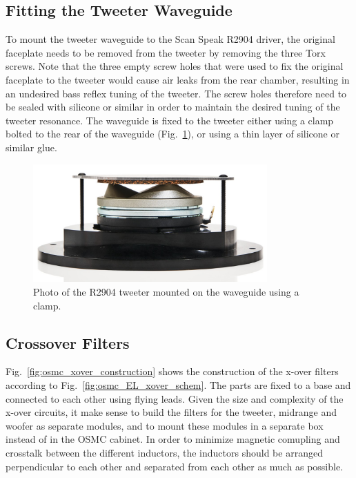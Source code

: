 \documentclass[12pt,a4paper]{article}
\providecommand{\figr}[1]{Fig.~\ref{fig:#1}}
\providecommand{\figlabel}[1]{\label{fig:#1}}
\begin{document}
\subsection{Fitting the Tweeter Waveguide}
To mount the tweeter waveguide to the Scan Speak R2904 driver, the original faceplate needs to be removed from the tweeter by removing the three Torx screws. Note that the three empty screw holes that were used to fix the original faceplate to the tweeter would cause air leaks from the rear chamber, resulting in an undesired bass reflex tuning of the tweeter.\cite{scan_waveguide_bassreflex} The screw holes therefore need to be sealed with silicone or similar in order to maintain the desired tuning of the tweeter resonance.\cite{scan_waveguide_seal} The waveguide is fixed to the tweeter either using a clamp\cite{osmc_p1070} bolted to the rear of the waveguide (\figr{waveguide_sandwich}), or using a thin layer of silicone or similar glue.


\begin{figure}[tbp]
	\centering
	\includegraphics[width=0.8\textwidth]{waveguide_sandwich.jpg}
	\caption{Photo of the R2904 tweeter mounted on the waveguide using a clamp.}
	\figlabel{waveguide_sandwich}
\end{figure}

\subsection{Crossover Filters}
\figr{osmc_xover_construction} shows the construction of the x-over filters according to \figr{osmc_EL_xover_schem}. The parts are fixed to a base and connected to each other using flying leads. Given the size and complexity of the x-over circuits, it make sense to build the filters for the tweeter, midrange and woofer as separate modules, and to mount these modules in a separate box instead of in the OSMC cabinet. In order to minimize magnetic comupling and crosstalk between the different inductors, the inductors should be arranged perpendicular to each other and separated from each other as much as possible.\cite{osmc_p833}
\end{document}
